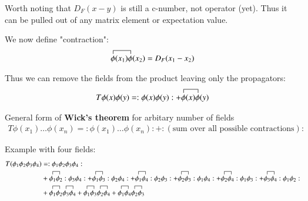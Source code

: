 Worth noting that $D_F(x-y)$ is still a c-number, not operator (yet). Thus it can be pulled out of any matrix element or expectation value.

We now define "contraction":
\begin{align}
	\contraction[1ex]{}{\phi}{(x_1)}{\phi}	\phi(x_1) \phi(x_2) = D_F(x_1-x_2)
\end{align}

Thus we can remove the fields from the product leaving only the propagators:
\begin{align}
	T\phi(x)\phi(y) = :\phi(x)\phi(y): +  \contraction[1ex]{}{\phi}{(x)}{\phi}	\phi(x) \phi(y)
\end{align}

General form of \textbf{Wick's theorem} for arbitary number of fields
\begin{align}
	T\phi(x_1)\dots \phi(x_n) = :\phi(x_1)\dots \phi(x_n):	 + :\left( \text{sum over all possible contractions} \right):
\end{align}

Example with four fields:
\begin{align*}
	T(\phi_1 \phi_2 \phi_3 \phi_4) &= :\phi_1 \phi_2 \phi_3 \phi_4: \\
								   & + \contraction{}{\phi_1}{}{\phi_2} \phi_1 \phi_2 :\phi_3 \phi_4: + \contraction{}{\phi_1}{}{\phi_3} \phi_1 \phi_3 :\phi_2 \phi_4: + \contraction{}{\phi_1}{}{\phi_4} \phi_1 \phi_4 :\phi_2 \phi_3: +  \contraction{}{\phi_2}{}{\phi_3} \phi_2 \phi_3 :\phi_1 \phi_4: + \contraction{}{\phi_2}{}{\phi_4} \phi_2 \phi_4 :\phi_1 \phi_3: + \contraction{}{\phi_3}{}{\phi_4} \phi_3 \phi_4 :\phi_1 \phi_2: \\
	&+ \contraction{}{\phi_1}{}{\phi_2} \phi_1 \phi_2 \contraction{}{\phi_3}{}{\phi_4}\phi_3 \phi_4 + \contraction{}{\phi_1}{}{\phi_3} \phi_1 \phi_3 \contraction{}{\phi_2}{}{\phi_4}\phi_2 \phi_4 + \contraction{}{\phi_1}{}{\phi_4} \phi_1 \phi_4 \contraction{}{\phi_2}{}{\phi_3}\phi_2 \phi_3
\end{align*}


